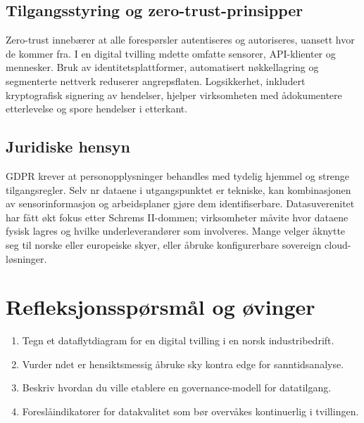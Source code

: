 \subsection{Tilgangsstyring og zero-trust-prinsipper}
Zero-trust inneb\ae rer at alle foresp\o rsler autentiseres og autoriseres, uansett hvor de kommer fra. I en digital tvilling m\a dette omfatte sensorer, API-klienter og mennesker. Bruk av identitetsplattformer, automatisert n\o kkellagring og segmenterte nettverk reduserer angrepsflaten. Logsikkerhet, inkludert kryptografisk signering av hendelser, hjelper virksomheten med \aa dokumentere etterlevelse og spore hendelser i etterkant.

\subsection{Juridiske hensyn}
GDPR krever at personopplysninger behandles med tydelig hjemmel og strenge tilgangsregler. Selv n\a r dataene i utgangspunktet er tekniske, kan kombinasjonen av sensorinformasjon og arbeidsplaner gj\o re dem identifiserbare. Datasuverenitet har f\aa tt \o kt fokus etter Schrems II-dommen; virksomheter m\aa vite hvor dataene fysisk lagres og hvilke underleverand\o rer som involveres. Mange velger \aa knytte seg til norske eller europeiske skyer, eller \aa bruke konfigurerbare sovereign cloud-l\o sninger.

\section{Refleksjonssp\o rsm\aa l og \o vinger}
\begin{enumerate}
    \item Tegn et dataflytdiagram for en digital tvilling i en norsk industribedrift.
    \item Vurder n\aar det er hensiktsmessig \aa bruke sky kontra edge for sanntidsanalyse.
    \item Beskriv hvordan du ville etablere en governance-modell for datatilgang.
    \item Foresl\aa indikatorer for datakvalitet som b\o r overv\aa kes kontinuerlig i tvillingen.
\end{enumerate}
